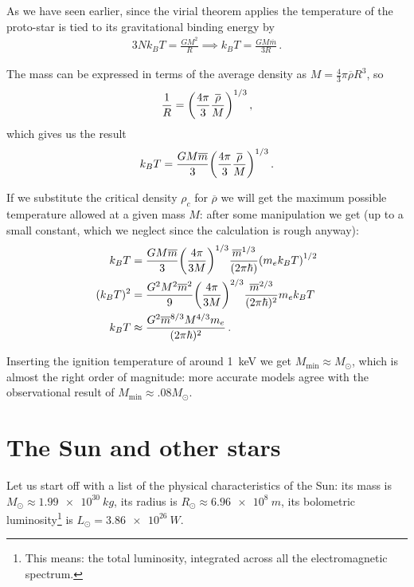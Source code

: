 \documentclass[main.tex]{subfiles}
\begin{document}
As we have seen earlier, since the virial theorem applies the temperature of the proto-star is tied to its gravitational binding energy by
%
\begin{align}
  3 N k_B T = \frac{GM^2}{R} \implies k_B T = \frac{GM \overline{m}}{3  R}
\,.
\end{align}

The mass can be expressed in terms of the average density as 
\(M = \frac{4}{3} \pi \overline{\rho} R^3 \), so 
%
\begin{align}
  \frac{1}{R} = \qty(\frac{4 \pi }{3} \frac{\overline{\rho}}{M})^{1/3}
\,,
\end{align}
%
which gives us the result 
%
\begin{align}
  k_B T = \frac{GM \overline{m}}{3} \qty(\frac{4 \pi }{3} \frac{\overline{\rho}}{M})^{1/3}
\,.
\end{align}

If we substitute the critical density \(\rho _c\) for \(\overline{\rho}\) we will get the maximum possible temperature allowed at a given mass \(M\): after some manipulation we get (up to a small constant, which we neglect since the calculation is rough anyway):
%
\begin{align}
  k_B T &= \frac{GM \overline{m}}{3} \qty(\frac{4 \pi }{3 M})^{1/3} \frac{\overline{m}^{1/3}}{(2 \pi \hbar)} \qty(m_e k_B T)^{1/2} \\
  (k_B T)^2 &= \frac{G^2M^2 \overline{m}^2}{9} 
  \qty(\frac{4 \pi }{3 M})^{2/3} \frac{\overline{m}^{2/3}}{(2 \pi \hbar)^2} m_e k_B T  \\
  k_B T &\approx \frac{G^2 \overline{m}^{8/3} M^{4/3} m_e}{(2 \pi \hbar)^2} 
\,.
\end{align}

Inserting the ignition temperature of around \SI{1}{keV} we get \(M _{\text{min}} \approx M_{\odot}\), which is almost the right order of magnitude: more accurate models agree with the observational result of \(M _{\text{min}} \approx \num{.08} M_{\odot}\). 

\section{The Sun and other stars}

Let us start off with a list of the physical characteristics of the Sun: its mass is \(M_{\odot} \approx \SI{1.99e30}{kg}\), its radius is \(R_{\odot} \approx \SI{6.96e8}{m}\), its bolometric luminosity\footnote{This means: the total luminosity, integrated across all the electromagnetic spectrum.} is \(L_{\odot} = \SI{3.86e26}{W}\). 
\end{document}
